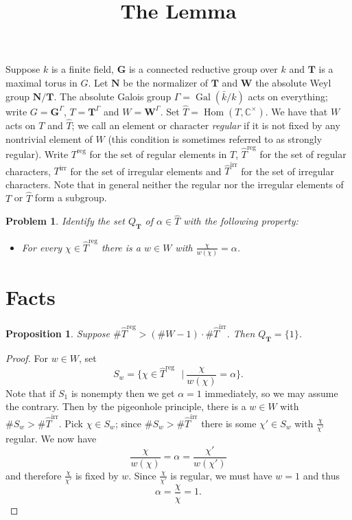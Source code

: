 \documentclass[11pt]{amsart}
\theoremstyle{plain}
\newtheorem{proposition}[theorem]{Proposition}
\newtheorem*{problem}{Problem}
\theoremstyle{definition}
\DeclareMathOperator{\Gal}{Gal}
\DeclareMathOperator{\Hom}{Hom}
\newcommand{\st}{\ensuremath{\ \ \ \vert\ }}
\newcommand{\CC}{\mathbb{C}}
\newcommand{\T}{\mathbf{T}}
\newcommand{\G}{\mathbf{G}}
\newcommand{\N}{\mathbf{N}}
\newcommand{\W}{\mathbf{W}}
\newcommand{\Galk}{\Gamma}
\newcommand{\hatT}{\hat{T}}
\newcommand{\Treg}{T^{\operatorname{reg}}}
\newcommand{\Threg}{\hatT^{\operatorname{reg}}}
\newcommand{\Tirr}{T^{\operatorname{irr}}}
\newcommand{\Thirr}{\hatT^{\operatorname{irr}}}
\begin{document}
\title{The Lemma}

Suppose $k$ is a finite field, $\G$ is a connected reductive group over $k$ and $\T$ is a maximal torus in $G$.  Let $\N$ be the normalizer of $\T$ and $\W$ the absolute Weyl group $\N / \T$.  The absolute Galois group $\Galk = \Gal(\bar{k}/k)$ acts on everything; write $G = \G^\Galk$, $T = \T^\Galk$ and $W = \W^\Galk$.  Set $\hatT = \Hom(T, \CC^\times)$.  We have that $W$ acts on $T$ and $\hat{T}$; we call an element or character \emph{regular} if it is not fixed by any nontrivial element of $W$ (this condition is sometimes referred to as strongly regular).  Write $\Treg$ for the set of regular elements in $T$, $\Threg$ for the set of regular characters, $\Tirr$ for the set of irregular elements and $\Thirr$ for the set of irregular characters.  Note that in general neither the regular nor the irregular elements of $T$ or $\hatT$ form a subgroup.

\begin{problem}
Identify the set $Q_{\T}$ of $\alpha \in \hatT$ with the following property:
\begin{itemize}
\item For every $\chi \in \Threg$ there is a $w \in W$ with $\frac{\chi}{w(\chi)} = \alpha$.
\end{itemize}
\end{problem}

\section{Facts}

\begin{proposition} \label{pigeonhole}
Suppose $\#\Threg > (\# W - 1) \cdot \# \Thirr$.  Then $Q_{\T} = \{ 1 \}$.
\end{proposition}
\begin{proof}
For $w \in W$, set
$$S_w = \{\chi \in \Threg \st  \frac{\chi}{w(\chi)} = \alpha\}.$$
Note that if $S_1$ is nonempty then we get $\alpha = 1$ immediately, so we may assume the contrary.  Then by the pigeonhole principle, there is a $w \in W$ with $\# S_w > \# \Thirr$.  Pick $\chi \in S_w$; since $\# S_w > \#\Thirr$ there is some $\chi' \in S_w$ with $\frac{\chi}{\chi'}$ regular.  We now have
$$\frac{\chi}{w(\chi)} = \alpha = \frac{\chi'}{w(\chi')}$$
and therefore $\frac{\chi}{\chi'}$ is fixed by $w$.  Since $\frac{\chi}{\chi'}$ is regular, we must have $w = 1$ and thus 
$$\alpha = \frac{\chi}{\chi} = 1.$$
\end{proof}
\end{document}
